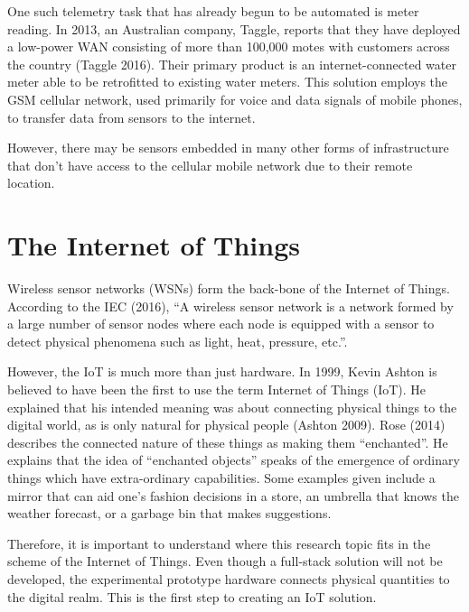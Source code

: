 One such telemetry task that has already begun to be automated is meter reading. In 2013, an Australian company, Taggle, reports that they have deployed a low-power WAN consisting of more than 100,000 motes with customers across the country (Taggle 2016). Their primary product is an internet-connected water meter able to be retrofitted to existing water meters. This solution employs the GSM cellular network, used primarily for voice and data signals of mobile phones, to transfer data from sensors to the internet.

However, there may be sensors embedded in many other forms of infrastructure that don’t have access to the cellular mobile network due to their remote location.


\section{The Internet of Things}

Wireless sensor networks (WSNs) form the back-bone of the Internet of Things. According to the IEC (2016), “A wireless sensor network is a network formed by a large number of sensor nodes where each node is equipped with a sensor to detect physical phenomena such as light, heat, pressure, etc.”.

However, the IoT is much more than just hardware. In 1999, Kevin Ashton is believed to have been the first to use the term Internet of Things (IoT). He explained that his intended meaning was about connecting physical things to the digital world, as is only natural for physical people (Ashton 2009). Rose (2014) describes the connected nature of these things as making them “enchanted”. He explains that the idea of “enchanted objects” speaks of the emergence of ordinary things which have extra-ordinary capabilities. Some examples given include a mirror that can aid one’s fashion decisions in a store, an umbrella that knows the weather forecast, or a garbage bin that makes suggestions.

Therefore, it is important to understand where this research topic fits in the scheme of the Internet of Things. Even though a full-stack solution will not be developed, the experimental prototype hardware connects physical quantities to the digital realm. This is the first step to creating an IoT solution.

